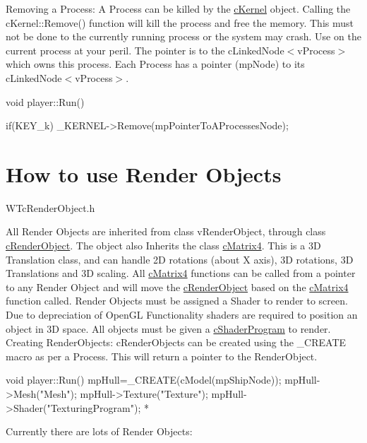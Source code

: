 Removing a Process: A Process can be killed by the \hyperlink{classc_kernel}{cKernel} object. Calling the cKernel::Remove() function will kill the process and free the memory. This must not be done to the currently running process or the system may crash. Use on the current process at your peril. The pointer is to the cLinkedNode$<$vProcess$>$ which owns this process. Each Process has a pointer (mpNode) to its cLinkedNode$<$vProcess$>$. 
\begin{DoxyCode}
 void player::Run()
 {

 if(KEY_k) _KERNEL->Remove(mpPointerToAProcessesNode);

 }
\end{DoxyCode}
 \hypertarget{_using_engine_page_RenderObjectsPage}{}\section{How to use Render Objects}\label{_using_engine_page_RenderObjectsPage}
WTcRenderObject.h

All Render Objects are inherited from class vRenderObject, through class \hyperlink{classc_render_object}{cRenderObject}. The object also Inherits the class \hyperlink{classc_matrix4}{cMatrix4}. This is a 3D Translation class, and can handle 2D rotations (about X axis), 3D rotations, 3D Translations and 3D scaling. All \hyperlink{classc_matrix4}{cMatrix4} functions can be called from a pointer to any Render Object and will move the \hyperlink{classc_render_object}{cRenderObject} based on the \hyperlink{classc_matrix4}{cMatrix4} function called. Render Objects must be assigned a Shader to render to screen. Due to depreciation of OpenGL Functionality shaders are required to position an object in 3D space. All objects must be given a \hyperlink{classc_shader_program}{cShaderProgram} to render. Creating RenderObjects: cRenderObjects can be created using the \_\-CREATE macro as per a Process. This will return a pointer to the RenderObject. 
\begin{DoxyCode}
 void player::Run()
 {
        mpHull=_CREATE(cModel(mpShipNode));
        mpHull->Mesh("Mesh");
        mpHull->Texture("Texture");
        mpHull->Shader("TexturingProgram");
 }
 *
\end{DoxyCode}


Currently there are lots of Render Objects:

